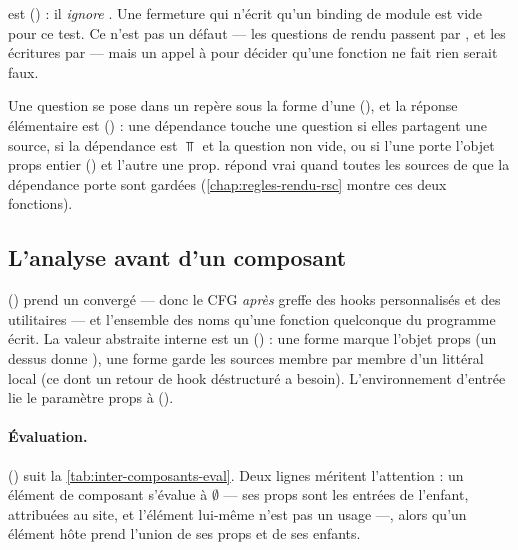 \begin{piege}
 est  () :
il \emph{ignore} . Une fermeture qui n'écrit qu'un binding de module est
\og vide\fg{} pour ce test. Ce n'est pas un défaut --- les questions de rendu passent par
, et les écritures par  --- mais un appel à  pour
décider qu'une fonction \og ne fait rien\fg{} serait faux.
\end{piege}

Une question se pose dans un repère sous la forme d'une 
(), et la réponse élémentaire est 
() : une dépendance touche une question si elles
partagent une source, si la dépendance est $\Top$ et la question non vide, ou si l'une porte
l'objet props entier () et l'autre une prop.  répond vrai
quand toutes les sources de  que la dépendance porte sont gardées
(\cref{chap:regles-rendu-rsc} montre ces deux fonctions).

\subsection{L'analyse avant d'un composant}

 () prend un 
convergé --- donc le CFG \emph{après} greffe des hooks personnalisés et des utilitaires --- et
l'ensemble  des noms qu'une fonction quelconque du programme écrit. La valeur
abstraite interne est un 
() : une forme  marque l'objet props (un
 dessus donne ), une forme  garde les sources membre
par membre d'un littéral local (ce dont un retour de hook déstructuré a besoin). L'environnement
d'entrée lie le paramètre props à 
().

\paragraph{Évaluation.}  () suit la
\cref{tab:inter-composants-eval}. Deux lignes méritent l'attention : un élément de composant
s'évalue à $\emptyset$ --- ses props sont les entrées de l'enfant, attribuées au site, et
l'élément lui-même n'est pas un usage ---, alors qu'un élément hôte prend l'union de ses props
et de ses enfants.

